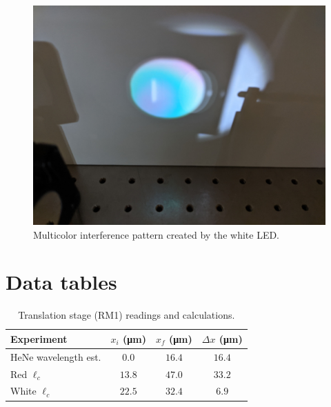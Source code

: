 \documentclass[notitlepage]{report}
\begin{document}
	
	\begin{figure}[h]
		\centering
		\includegraphics[width=0.5\linewidth]{PXL_20210205_005820272}
		\caption{Multicolor interference pattern created by the white LED.}
		\label{fig:whiteinterference}
	\end{figure}
	
	\newpage
	\section*{Data tables}
	\begin{table}[h]
		\caption{Translation stage (RM1) readings and calculations.}
		\begin{center}			
			\begin{tabular}{lccc}
				\toprule
				Experiment & $x_i$ (\si{\um}) & $x_f$ (\si{\um}) & $\Delta x$ (\si{\um}) \\
				\midrule
				HeNe wavelength est. & $0.0$ & $16.4$ & $16.4$ \\
				Red $\ell_c$ & $13.8$ & $47.0$ & $33.2$ \\
				White $\ell_c$ & $22.5$ & $32.4$ & $6.9$  \\
				\bottomrule
			\end{tabular}
		\end{center}
	\end{table}
\end{document}

